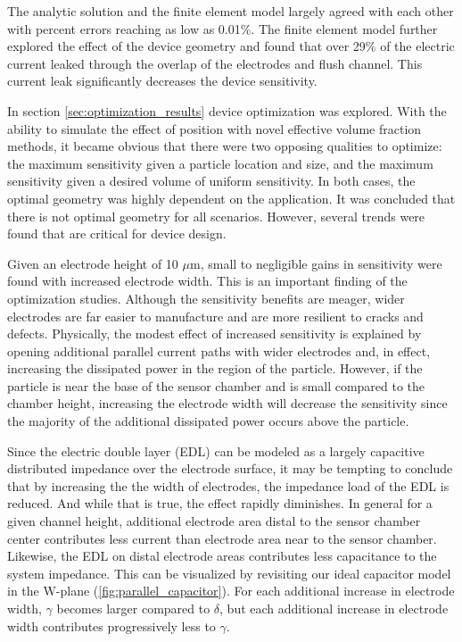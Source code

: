 \par The analytic solution and the finite element model largely agreed with each other with percent errors reaching as low as 0.01\%. The finite element model further explored the effect of the device geometry and found that over 29\% of the electric current leaked through the overlap of the electrodes and flush channel. This current leak significantly decreases the device sensitivity. 


\par In section \ref{sec:optimization_results} device optimization was explored. With the ability to simulate the effect of position with novel effective volume fraction methods, it became obvious that there were two opposing qualities to optimize: the maximum sensitivity given a particle location and size, and the maximum sensitivity given a desired volume of uniform sensitivity. In both cases, the optimal geometry was highly dependent on the application. It was concluded that there is not optimal geometry for all scenarios. However, several trends were found that are critical for device design.

\par Given an electrode height of 10 $\mu$m, small to negligible gains in sensitivity were found with increased electrode width. This is an important finding of the optimization studies.  Although the sensitivity benefits are meager, wider electrodes are far easier to manufacture and are more resilient to cracks and defects. Physically, the modest effect of increased sensitivity is explained by opening additional parallel current paths with wider electrodes and, in effect, increasing the dissipated power in the region of the particle. However, if the particle is near the base of the sensor chamber and is small compared to the chamber height, increasing the electrode width will decrease the sensitivity since the majority of the additional dissipated power occurs above the particle. 

\par Since the electric double layer (EDL) can be modeled as a largely capacitive distributed impedance over the electrode surface, it may be tempting to conclude that by increasing the the width of electrodes, the impedance load of the EDL is reduced.  And while that is true, the effect rapidly diminishes. In general for a given channel height, additional electrode area distal to the sensor chamber center contributes less current than electrode area near to the sensor chamber. Likewise, the EDL on distal electrode areas contributes less capacitance to the system impedance. This can be visualized by revisiting our ideal capacitor model in the W-plane (\ref{fig:parallel_capacitor}). For each additional increase in electrode width, $\gamma$ becomes larger compared to $\delta$, but each additional increase in electrode width contributes progressively less to $\gamma$. 

